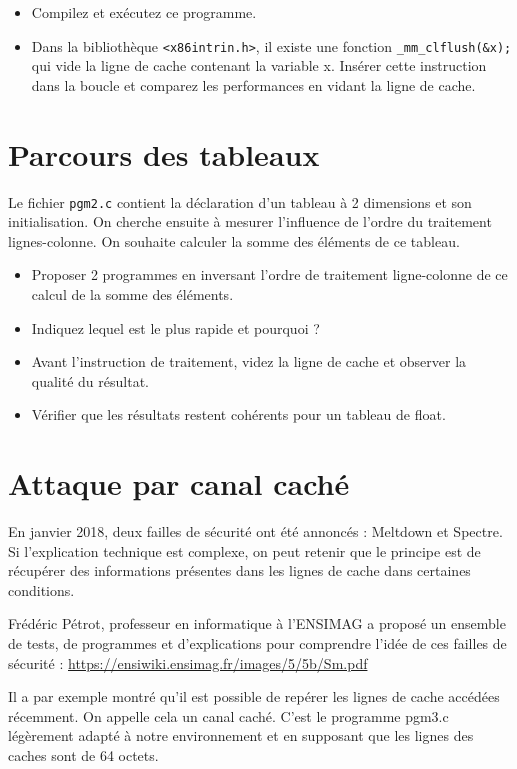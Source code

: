 \documentclass{article}
\begin{document}
\begin{itemize}
\item Compilez et exécutez ce programme. 

\item  Dans la bibliothèque \texttt{<x86intrin.h>}, il existe une fonction
\texttt{\_mm\_clflush(\&x);} qui vide la ligne de cache contenant la
variable x. Insérer cette instruction dans la boucle et comparez les
performances en vidant la ligne de cache.

\end{itemize}

\section{Parcours des tableaux}
Le fichier \texttt{pgm2.c} contient la déclaration d’un tableau à 2 dimensions et son initialisation. On cherche ensuite à mesurer l’influence de l’ordre du traitement
lignes-colonne. On souhaite calculer la somme des éléments de ce
tableau.

\begin{itemize}
\item Proposer 2 programmes en inversant l’ordre de traitement
ligne-colonne de ce calcul de la somme des éléments.
\item Indiquez lequel est le plus rapide et pourquoi ? 
\item Avant l’instruction de traitement, videz la ligne de cache et observer la qualité du résultat. 
\item  Vérifier que les résultats restent cohérents pour un tableau de float.
\end{itemize}
\section{Attaque par canal caché}
En janvier 2018, deux failles de sécurité ont été annoncés : Meltdown
et Spectre. Si l’explication technique est complexe, on peut retenir
que le principe est de récupérer des informations présentes dans les
lignes de cache dans certaines conditions. 

Frédéric Pétrot, professeur en informatique à l’ENSIMAG a proposé un
ensemble de tests, de programmes et d’explications pour comprendre
l’idée de ces failles de sécurité :
\url{https://ensiwiki.ensimag.fr/images/5/5b/Sm.pdf} 

Il a par exemple montré qu’il est possible de repérer les lignes de
cache accédées récemment. On appelle cela un canal caché. C’est le
programme pgm3.c légèrement adapté à notre environnement et en
supposant que les lignes des caches sont de 64 octets.
\end{document}
